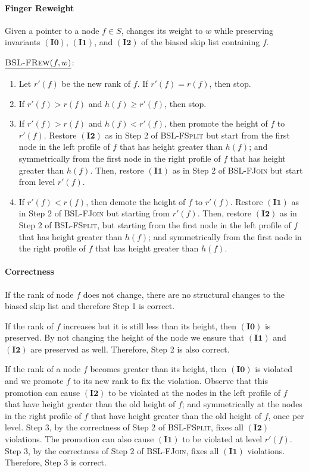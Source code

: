 \documentclass[11pt]{article}
\newcommand{\Bslfspl}{\mbox{\textsc{BSL-FSplit}}}
\newcommand{\Bslfjoin}{\mbox{\textsc{BSL-FJoin}}}
\newcommand{\Bslfrewx}[2]{\mbox{\textsc{BSL-FRew(\ensuremath{#1,#2})}}}
\newcommand{\invzero}{\ensuremath{\mathbf{(I0)}}}
\newcommand{\invone}{\ensuremath{\mathbf{(I1)}}}
\newcommand{\invtwo}{\ensuremath{\mathbf{(I2)}}}
\newcommand{\nodeheight}[1]{\ensuremath{h(#1)}}
\newcommand{\noderank}[1]{\ensuremath{r(\node #1)}}
\newcommand{\nodenewrank}[1]{\ensuremath{r'(\node #1)}}
\newcommand{\node}[1]{\ensuremath{#1}}
\newcommand{\bsl}[1]{\ensuremath{#1}}
\begin{document}
\paragraph{Finger Reweight} 
Given a pointer to a node $\node f \in \bsl S$, changes its weight to $w$ while preserving invariants \invzero{}, \invone{}, and \invtwo{} of the biased skip list containing $\node f$. 


\vspace{5mm} 
\noindent$\underline{\Bslfrewx{f}{w}}$: 
\begin{enumerate} 
\item Let \nodenewrank f be the new rank of \node f. If $\nodenewrank f = \noderank f$, then stop. 
\item If $\nodenewrank f > \noderank f$ and $\nodeheight f \geq \nodenewrank f$, then stop. 
\item If $\nodenewrank f > \noderank f$ and $\nodeheight f < \nodenewrank f$, then promote the height of $f$ to \nodenewrank f. Restore \invtwo{} as in Step 2 of \Bslfspl{} but start from the first node in the left profile of \node f that has height greater than \nodeheight f; and symmetrically from the first node in the right profile of \node f that has height greater than \nodeheight f. Then, restore \invone{} as in Step 2 of \Bslfjoin{} but start from level \nodenewrank f. 
\item If $\nodenewrank f < \noderank f$, then demote the height of \node f to \nodenewrank f. Restore \invone{} as in Step 2 of \Bslfjoin{} but starting from \nodenewrank f. Then, restore \invtwo{} as in Step 2 of \Bslfspl{}, but starting from the first node in the left profile of \node f that has height greater than \nodeheight f; and symmetrically from the first node in the right profile of \node f that has height greater than \nodeheight f. 
\end{enumerate} 

\paragraph{Correctness} If the rank of node \node f does not change, there are no structural changes to the biased skip list and therefore Step 1 is correct. 

If the rank of \node f increases but it is still less than its height, then \invzero{} is preserved. By not changing the height of the node we ensure that \invone{} and \invtwo{} are preserved as well. Therefore, Step 2 is also correct. 


If the rank of a node \node f becomes greater than its height, then \invzero{} is violated and we promote \node f to its new rank to fix the violation. Observe that this promotion can cause \invtwo{} to be violated at the nodes in the left profile of \node f that have height greater than the old height of \node f; and symmetrically at the nodes in the right profile of \node f that have height greater than the old height of \node f, once per level. Step 3, by the correctness of Step 2 of \Bslfspl{}, fixes all \invtwo{} violations. The promotion can also cause \invone{} to be violated at level \nodenewrank f. Step 3, by the correctness of Step 2 of \Bslfjoin{}, fixes all \invone{} violations. Therefore, Step 3 is correct. 
\end{document}
